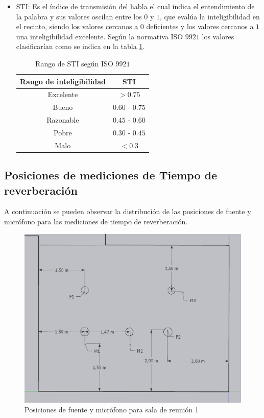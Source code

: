\begin{itemize}
    
    \item STI: Es el índice de transmisión del habla el cual indica el entendimiento de la palabra y sus valores oscilan entre los $0$ y $1$, que evalúa la inteligibilidad en el recinto, siendo los valores cercanos a 0 deficientes y los valores cercanos a $1$ una inteligibilidad excelente. Según la normativa ISO $9921$ \cite{ISO9921} los valores clasificarían como se indica en la tabla \ref{tab: rango STI}. 

\begin{table}[H]
    \centering
    \caption{Rango de STI según ISO $9921$}
    \label{tab: rango STI}
    \begin{tabular}{|c|c|}
    \hline
    \textbf{Rango de inteligibilidad} & \textbf{STI} \\ \hline
    Excelente                &     $>0.75$     \\ \hline
    Bueno                    & $0.60$ - $0.75$ \\ \hline
    Razonable                & $0.45$ - $0.60$ \\ \hline
    Pobre                    & $0.30$ - $0.45$ \\ \hline
    Malo                     & $<0.3$ \\ \hline
    \end{tabular}
\end{table}
\end{itemize}


\subsection{Posiciones de mediciones de Tiempo de reverberación}\label{subsec: posiciones RT}
A continuación se pueden observar la distribución de las posiciones de fuente y micrófono para las mediciones de tiempo de reverberación.
\begin{figure}[H]
    \centering
    \includegraphics[scale=0.4]{Imagenes/PosicionesRT/Posiciones Sala 1.png}
    \caption{Posiciones de fuente y micrófono para sala de reunión 1}
    \label{fig: posiciones sala1}
\end{figure}

